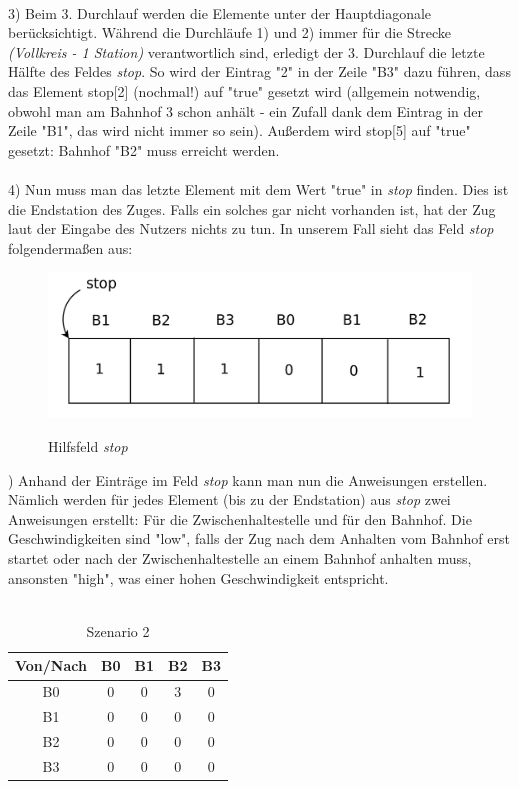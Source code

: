 \\
3) Beim 3. Durchlauf werden die Elemente unter der Hauptdiagonale berücksichtigt. Während die Durchläufe 1) und 2) immer für die Strecke \textit{(Vollkreis - 1 Station)} verantwortlich sind, erledigt der 3. Durchlauf die letzte Hälfte des Feldes \textit{stop}. So wird der Eintrag "2" in der Zeile "B3" dazu führen, dass das Element stop[2] (nochmal!) auf "true" gesetzt wird (allgemein notwendig, obwohl man am Bahnhof 3 schon anhält - ein Zufall dank dem Eintrag in der Zeile "B1", das wird nicht immer so sein). Außerdem wird stop[5] auf "true" gesetzt: Bahnhof "B2" muss erreicht werden.\\
\\
4) Nun muss man das letzte Element mit dem Wert "true" in \textit{stop} finden. Dies ist die Endstation des Zuges. Falls ein solches gar nicht vorhanden ist, hat der Zug laut der Eingabe des Nutzers nichts zu tun. In unserem Fall sieht das Feld \textit{stop} folgendermaßen aus:\\
\begin{figure}[H]	
\caption{Hilfsfeld \textit{stop}}
\includegraphics[width=2\textwidth, width=290pt]{content/images/stop1.png}
\label{pic:stop1}
\end{figure}
) Anhand der Einträge im Feld \textit{stop} kann man nun die Anweisungen erstellen. Nämlich werden für jedes Element (bis zu der Endstation) aus \textit{stop} zwei Anweisungen erstellt: Für die Zwischenhaltestelle und für den Bahnhof. Die Geschwindigkeiten sind "low", falls der Zug nach dem Anhalten vom Bahnhof erst startet oder nach der Zwischenhaltestelle an einem Bahnhof anhalten muss, ansonsten "high", was einer hohen Geschwindigkeit entspricht.\\
\\
\begin{table}[H]
\caption{Szenario 2}
\center
 \begin{tabular}{|c|c|c|c|c|}
 \hline
  Von/Nach & B0 & B1 & B2 & B3 \\ \hline
  B0 & 0 & 0 & 3 & 0\\   \hline
    B1 & 0 & 0 & 0 & 0 \\   \hline
      B2 & 0 & 0 & 0 & 0\\   \hline
        B3 & 0 & 0 & 0 & 0 \\   \hline
 \end{tabular}
\end{table}
